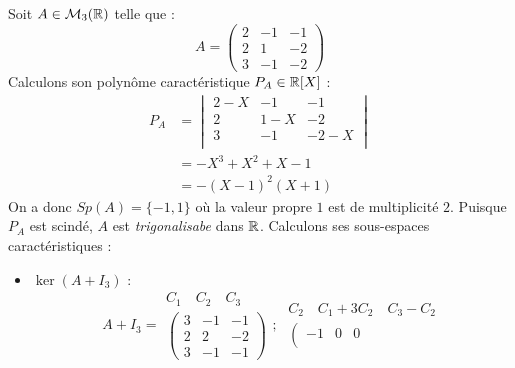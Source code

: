 \begin{example}[Trigonalisation]
    Soit $A \in \mathcal{M}_3(\mathbb{R})$ telle que :
        \[ A = 
            \begin{pmatrix}
                2 & -1 & -1 \\ 
                2 & 1 & -2 \\ 
                3 & -1 & -2
            \end{pmatrix}
        \]
    Calculons son polynôme caractéristique $ P_A \in \mathbb{R}[X]$ : 
    \begin{align*}
        P_A &= 
            \begin{vmatrix}
                2 - X & -1 & -1 \\ 
                2 & 1 -X & -2 \\ 
                3 & -1 & -2 -X \\ 
            \end{vmatrix} \\ 
            &= -X^3 + X^2 + X -1 \\ 
            &= -(X-1)^2(X+1)  
    \end{align*}
    On a donc $Sp(A) = \{-1, 1\}$ où la valeur propre $1$ est de multiplicité $2$. 
    Puisque $P_A$ est scindé, $A$ est \emph{trigonalisabe} dans $\mathbb{R}$. 
    Calculons ses sous-espaces caractéristiques : 
    \begin{itemize}
        \item $\ker (A + I_3)$ : 
            \[ 
                A + I_3 = 
                \begin{array}{c}
                    \scriptstyle C_1 \quad C_2 \quad C_3 \\
                    \left(
                        \begin{array}{rrr}
                            3 & -1 & -1 \\
                            2 & 2 & -2 \\
                            3 & -1 & -1
                        \end{array}
                    \right)
                \end{array}
                ; \; 
                \begin{array}{c}
                    \scriptstyle C_2 \quad C_1 + 3C_2 \quad C_3 - C_2 \\
                    \left(
                        \begin{array}{rrr}
                            -1 & 0 & 0 \\

\end{array}
\end{array}\]
\end{itemize}
\end{example}
